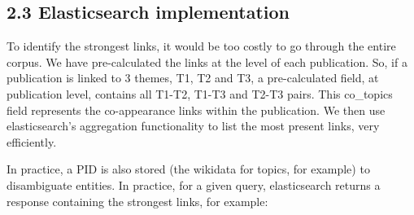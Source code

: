 \documentclass[
]{article}
\begin{document}
\hypertarget{elasticsearch-implementation}{%
\subsection{2.3 Elasticsearch
implementation}\label{elasticsearch-implementation}}

To identify the strongest links, it would be too costly to go through
the entire corpus. We have pre-calculated the links at the level of each
publication. So, if a publication is linked to 3 themes, T1, T2 and T3,
a pre-calculated field, at publication level, contains all T1-T2, T1-T3
and T2-T3 pairs. This co\_topics field represents the co-appearance
links within the publication. We then use elasticsearch's aggregation
functionality to list the most present links, very efficiently.

In practice, a PID is also stored (the wikidata for topics, for example)
to disambiguate entities. In practice, for a given query, elasticsearch
returns a response containing the strongest links, for example:
\end{document}
